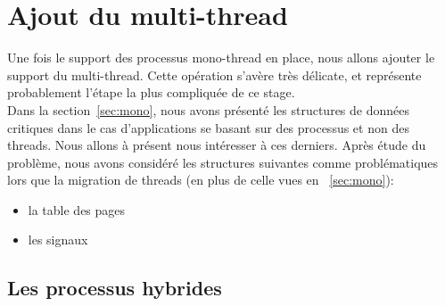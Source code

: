 


  \section{Ajout du multi-thread}
  \label{sec:multi}  

    Une fois le support des processus mono-thread en place, nous allons ajouter
    le support du multi-thread. Cette opération s'avère très délicate, et
    représente probablement l'étape la plus compliquée de ce stage.\\

    Dans la section~\ref{sec:mono}, nous avons présenté les structures de
    données critiques dans le cas d'applications se basant sur des processus et
    non des threads. Nous allons à présent nous intéresser à ces derniers. Après
    étude du problème, nous avons considéré les structures suivantes comme
    problématiques lors que la migration de threads (en plus de celle vues
    en ~\ref{sec:mono}):
    \begin{itemize}
      \item la table des pages
      \item les signaux
    \end{itemize}  

    \subsection{Les processus hybrides}

